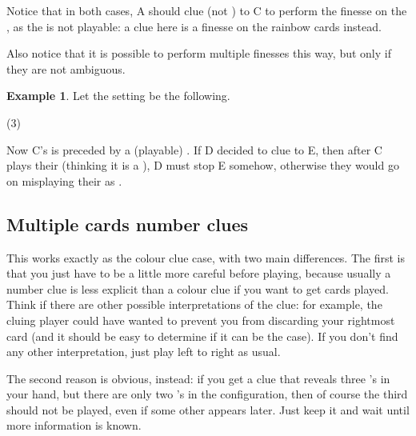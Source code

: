 \documentclass[a4paper]{article}
\theoremstyle{plain}
\theoremstyle{definition}
\newtheorem{example}[theorem]{Example}
\begin{document}
Notice that in both cases, A should clue  (not ) to C to perform the finesse on the , as the  is not playable: a  clue here is a finesse on the rainbow cards instead.

Also notice that it is possible to perform multiple finesses this way, but only if they are not ambiguous.

\begin{example}
	
	Let the setting be the following.
	
	\begin{tasks}(3)
		\task[+]      
		\task[A]    
		\task[B]    
		\task[C]    
		\task[D]    
		\task[E]    
	\end{tasks}
	
	Now C's  is preceded by a (playable) . If D decided to clue  to E, then after C plays their  (thinking it is a ), D must stop E somehow, otherwise they would go on misplaying their  as .
	
\end{example}

\subsection{Multiple cards number clues}

This works exactly as the colour clue case, with two main differences. The first is that you just have to be a little more careful before playing, because usually a number clue is less explicit than a colour clue if you want to get cards played. Think if there are other possible interpretations of the clue: for example, the cluing player could have wanted to prevent you from discarding your rightmost card (and it should be easy to determine if it can be the case). If you don't find any other interpretation, just play left to right as usual.

The second reason is obvious, instead: if you get a clue that reveals three 's in your hand, but there are only two 's in the configuration, then of course the third  should not be played, even if some other  appears later. Just keep it and wait until more information is known.


\end{document}
